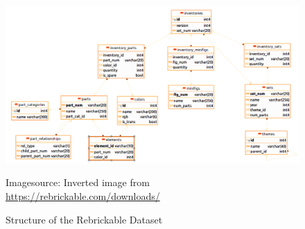 \documentclass{article}
\theoremstyle{plain}
\theoremstyle{definition}
\theoremstyle{remark}
\newcommand*{\quelle}{
  \footnotesize Imagesource: Inverted image from\\
}
\begin{document}
\begin{figure}[ht]
 \vskip 0.2in
 \begin{center}
 \centerline{\includegraphics[width=\columnwidth]{Images/inverted_database.png}}
 \quelle\url{https://rebrickable.com/downloads/}
\caption{Structure of the Rebrickable Dataset}
\label{icml-historical}
 \end{center}
 \vskip 0.1in
\end{figure}
\end{document}
